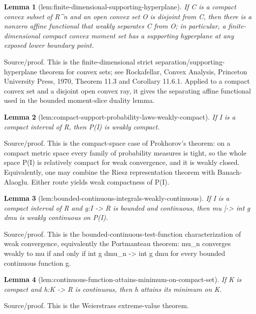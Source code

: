 \documentclass{article}
\newtheorem{lemma}{Lemma}
\begin{document}
\begin{lemma}[lem:finite-dimensional-supporting-hyperplane]\label{lem:finite-dimensional-supporting-hyperplane}
If C is a compact convex subset of R^n and an open convex set O is disjoint from C, then there is a nonzero affine functional that weakly separates C from O; in particular, a finite-dimensional compact convex moment set has a supporting hyperplane at any exposed lower boundary point.
\end{lemma}
Source/proof. This is the finite-dimensional strict separation/supporting-hyperplane theorem for convex sets; see Rockafellar, Convex Analysis, Princeton University Press, 1970, Theorem 11.3 and Corollary 11.6.1. Applied to a compact convex set and a disjoint open convex ray, it gives the separating affine functional used in the bounded moment-slice duality lemma.

\begin{lemma}[lem:compact-support-probability-laws-weakly-compact]\label{lem:compact-support-probability-laws-weakly-compact}
If I is a compact interval of R, then P(I) is weakly compact.
\end{lemma}
Source/proof. This is the compact-space case of Prokhorov's theorem: on a compact metric space every family of probability measures is tight, so the whole space P(I) is relatively compact for weak convergence, and it is weakly closed. Equivalently, one may combine the Riesz representation theorem with Banach-Alaoglu. Either route yields weak compactness of P(I).

\begin{lemma}[lem:bounded-continuous-integrals-weakly-continuous]\label{lem:bounded-continuous-integrals-weakly-continuous}
If I is a compact interval of R and g:I -> R is bounded and continuous, then mu |-> int g dmu is weakly continuous on P(I).
\end{lemma}
Source/proof. This is the bounded-continuous-test-function characterization of weak convergence, equivalently the Portmanteau theorem: mu_n converges weakly to mu if and only if int g dmu_n -> int g dmu for every bounded continuous function g.

\begin{lemma}[lem:continuous-function-attains-minimum-on-compact-set]\label{lem:continuous-function-attains-minimum-on-compact-set}
If K is compact and h:K -> R is continuous, then h attains its minimum on K.
\end{lemma}
Source/proof. This is the Weierstrass extreme-value theorem.
\end{document}
